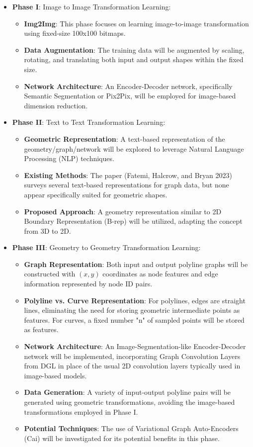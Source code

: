 \documentclass[conference]{IEEEtran}
\begin{document}
\begin{itemize}
\item {\bf Phase I}: Image to Image Transformation Learning:
	\begin{itemize}
	\item {\bf Img2Img}: This phase focuses on learning image-to-image transformation using fixed-size 100x100 bitmaps.
	\item {\bf Data Augmentation}: The training data will be augmented by scaling, rotating, and translating both input and output shapes within the fixed size.
	\item {\bf Network Architecture}: An Encoder-Decoder network, specifically Semantic Segmentation or Pix2Pix, will be employed for image-based dimension reduction.
	\end{itemize}
	
\item {\bf Phase II}: Text to Text Transformation Learning:
	\begin{itemize}
	\item {\bf Geometric Representation}: A text-based representation of the geometry/graph/network will be explored to leverage Natural Language Processing (NLP) techniques.
	\item {\bf Existing Methods}: The paper (Fatemi, Halcrow, and Bryan 2023) surveys several text-based representations for graph data, but none appear specifically suited for geometric shapes.
	\item {\bf Proposed Approach}: A geometry representation similar to 2D Boundary Representation (B-rep) will be utilized, adapting the concept from 3D to 2D.
	\end{itemize}
		
\item {\bf Phase III}: Geometry to Geometry Transformation Learning:
	\begin{itemize}
	\item {\bf Graph Representation}: Both input and output polyline graphs will be constructed with $(x,y)$ coordinates as node features and edge information represented by node ID pairs.
	\item {\bf Polyline vs. Curve Representation}: For polylines, edges are straight lines, eliminating the need for storing geometric intermediate points as features. For curves, a fixed number "n" of sampled points will be stored as features.
	\item {\bf Network Architecture}: An Image-Segmentation-like Encoder-Decoder network will be implemented, incorporating Graph Convolution Layers from DGL in place of the usual 2D convolution layers typically used in image-based models.
	\item {\bf Data Generation}: A variety of input-output polyline pairs will be generated using geometric transformations, avoiding the image-based transformations employed in Phase I.
	\item {\bf Potential Techniques}: The use of Variational Graph Auto-Encoders (Cai) will be investigated for its potential benefits in this phase.
	\end{itemize}
\end{itemize}		
\end{document}
